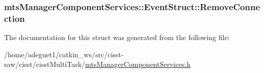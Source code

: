 \hypertarget{structmts_manager_component_services_1_1_event_struct_ac10cc608ffc0312aaeb4c3860e1c24c2}{
\subsubsection[{Remove\-Connection}]{ mts\-Manager\-Component\-Services\-::\-Event\-Struct\-::\-Remove\-Connection}}\label{structmts_manager_component_services_1_1_event_struct_ac10cc608ffc0312aaeb4c3860e1c24c2}


The documentation for this struct was generated from the following file\-:\begin{DoxyCompactItemize}
\item 
/home/adeguet1/catkin\-\_\-ws/src/cisst-\/saw/cisst/cisst\-Multi\-Task/\hyperlink{mts_manager_component_services_8h}{mts\-Manager\-Component\-Services.\-h}\end{DoxyCompactItemize}
